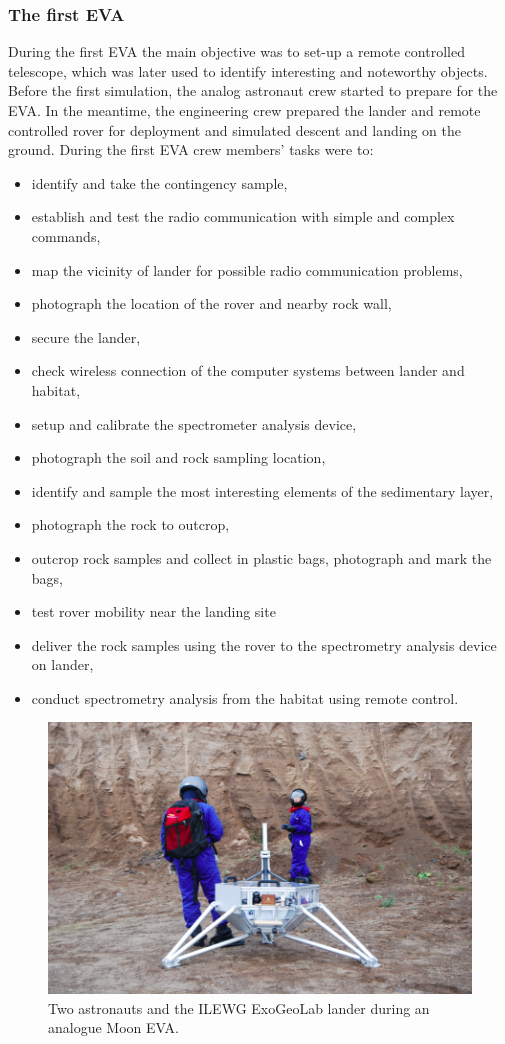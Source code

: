 \documentclass[preprint]{elsarticle}
\begin{document}
\subsubsection{The first EVA}
During the first EVA the main objective was to set-up a remote controlled telescope, which was later used to identify interesting and noteworthy objects. Before the first simulation, the analog astronaut crew started to prepare for the EVA. In the meantime, the engineering crew prepared the lander and remote controlled rover for deployment and simulated descent and landing on the ground. During the first EVA crew members' tasks were to:
\begin{itemize}
\item identify and take the contingency sample,
\item establish and test the radio communication with simple and complex commands,
\item map the vicinity of lander for possible radio communication problems,
\item photograph the location of the rover and nearby rock wall,
\item secure the lander,
\item check wireless connection of the computer systems between lander and habitat,
\item setup and calibrate the spectrometer analysis device,
\item photograph the soil and rock sampling location,
\item identify and sample the most interesting elements of the sedimentary layer,
\item photograph the rock to outcrop,
\item outcrop rock samples and collect in plastic bags, photograph and mark the bags,
\item test rover mobility near the landing site
\item deliver the rock samples using the rover to the spectrometry analysis device on lander,
\item conduct spectrometry analysis from the habitat using remote control.
\end{itemize}

\begin{figure}
\centering
\includegraphics{img/figure02.png}
\caption{Two astronauts and the ILEWG ExoGeoLab lander during an analogue Moon EVA.}
\end{figure}
\end{document}
